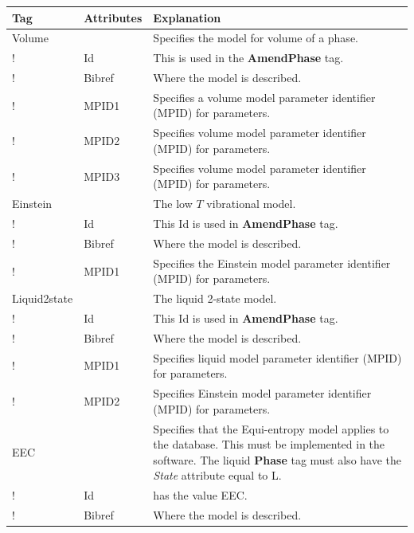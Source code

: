\documentclass{article}
\begin{document}
\bigskip
\begin{tabular}{|p{} p{} p{}|}\hline
  Tag & Attributes & Explanation\\\hline

    Volume & & Specifies the model for volume of a phase.\\
!      & Id & This is used in the {\bf AmendPhase} tag.\\
!      & Bibref & Where the model is described.\\
!      & MPID1 & Specifies a volume model parameter identifier
                    (MPID) for parameters.\\
!      & MPID2 & Specifies volume model parameter identifier
                    (MPID) for parameters.\\
!      & MPID3 & Specifies volume model parameter identifier
                    (MPID) for parameters.\\\hline

  Einstein & & The low $T$ vibrational model.\\
!      & Id & This Id is used in {\bf AmendPhase} tag.\\
!      & Bibref & Where the model is described.\\
!      & MPID1 & Specifies the Einstein model parameter identifier (MPID) for parameters.\\\hline

  Liquid2state & & The liquid 2-state model.\\
!      & Id & This Id is used in {\bf AmendPhase} tag.\\
!      & Bibref & Where the model is described.\\
!      & MPID1 & Specifies liquid model parameter identifier (MPID) for parameters.\\
!      & MPID2 & Specifies Einstein model parameter identifier (MPID) for parameters.\\\hline

  EEC & & Specifies that the Equi-entropy model applies to the database.
          This must be implemented in the software.  The liquid 
         {\bf Phase} tag must also have the {\em State} attribute equal to L. \\
!      & Id     & has the value EEC.\\
!      & Bibref & Where the model is described.\\\hline

\end{tabular}
\end{document}

